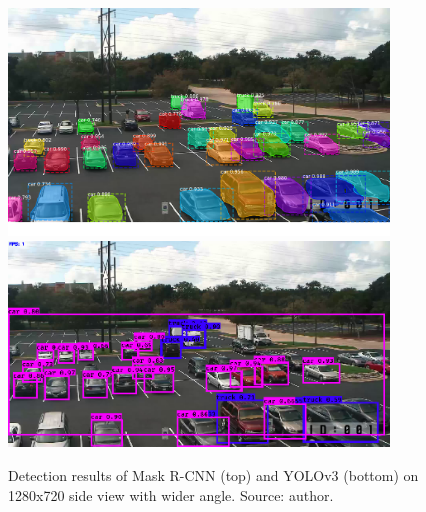 \documentclass[thesis=M,english]{FITthesis}[2019/03/06]
\begin{document}
\begin{figure}[!htb]
	\centering
	\includegraphics[width=0.90\textwidth]{imgs/mask-ytvid.png}
	\includegraphics[width=0.90\textwidth]{imgs/yolo-ytvid.png}
	\caption{Detection results of Mask R-CNN (top) and YOLOv3 (bottom) on 1280x720 side view with wider angle. Source: author.}
	\label{label:comparison_ytvid}
\end{figure}
\end{document}
